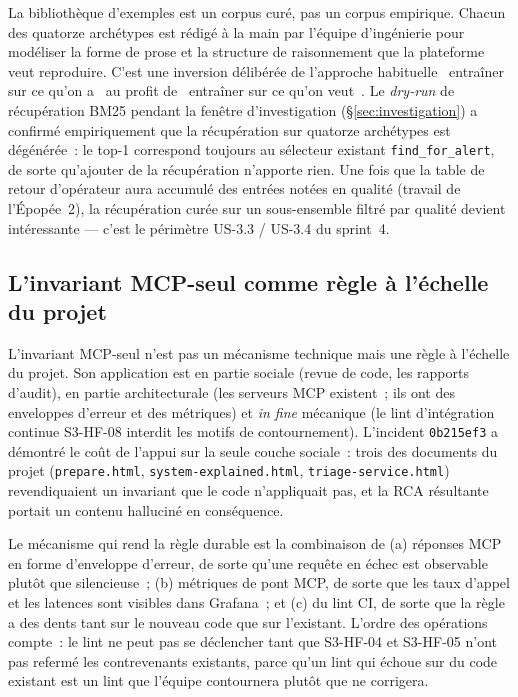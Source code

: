 \documentclass[11pt,a4paper,oneside]{report}
\begin{document}
La bibliothèque d'exemples est un corpus curé, pas un corpus
empirique. Chacun des quatorze archétypes est rédigé à la main par
l'équipe d'ingénierie pour modéliser la forme de prose et la
structure de raisonnement que la plateforme veut reproduire. C'est
une inversion délibérée de l'approche habituelle \og~entraîner sur
ce qu'on a~\fg{} au profit de \og~entraîner sur ce qu'on veut~\fg{}.
Le \emph{dry-run} de récupération BM25 pendant la fenêtre
d'investigation (\S\ref{sec:investigation}) a confirmé
empiriquement que la récupération sur quatorze archétypes est
dégénérée~: le top-1 correspond toujours au sélecteur existant
\texttt{find\_for\_alert}, de sorte qu'ajouter de la récupération
n'apporte rien. Une fois que la table de retour d'opérateur aura
accumulé des entrées notées en qualité (travail de l'Épopée~2), la
récupération curée sur un sous-ensemble filtré par qualité devient
intéressante --- c'est le périmètre US-3.3 / US-3.4 du sprint~4.

\subsection{L'invariant MCP-seul comme règle à l'échelle du projet}

L'invariant MCP-seul n'est pas un mécanisme technique mais une
règle à l'échelle du projet. Son application est en partie sociale
(revue de code, les rapports d'audit), en partie architecturale
(les serveurs MCP existent~; ils ont des enveloppes d'erreur et
des métriques) et \emph{in fine} mécanique (le lint d'intégration
continue S3-HF-08 interdit les motifs de contournement). L'incident
\texttt{0b215ef3} a démontré le coût de l'appui sur la seule couche
sociale~: trois des documents du projet
(\texttt{prepare.html}, \texttt{system-explained.html},
\texttt{triage-service.html}) revendiquaient un invariant que le
code n'appliquait pas, et la RCA résultante portait un contenu
halluciné en conséquence.

Le mécanisme qui rend la règle durable est la combinaison de
(a) réponses MCP en forme d'enveloppe d'erreur, de sorte qu'une
requête en échec est observable plutôt que silencieuse~;
(b) métriques de pont MCP, de sorte que les taux d'appel et les
latences sont visibles dans Grafana~; et (c) du lint CI, de sorte
que la règle a des dents tant sur le nouveau code que sur
l'existant. L'ordre des opérations compte~: le lint ne peut pas se
déclencher tant que S3-HF-04 et S3-HF-05 n'ont pas refermé les
contrevenants existants, parce qu'un lint qui échoue sur du code
existant est un lint que l'équipe contournera plutôt que ne
corrigera.
\end{document}
